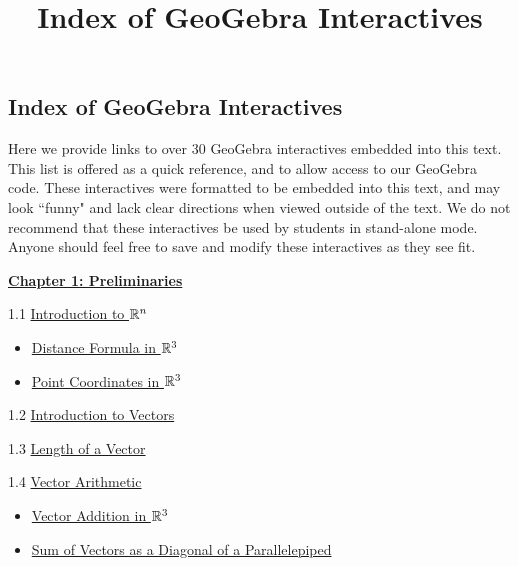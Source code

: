 \documentclass{ximera}
\title{Index of GeoGebra Interactives} \license{CC BY-NC-SA 4.0}
\begin{document}
\begin{abstract}
\end{abstract}
\maketitle

\begin{onlineOnly}
\section*{Index of GeoGebra Interactives}
\end{onlineOnly}

Here we provide links to over 30 GeoGebra interactives embedded into this text.  This list is offered as a quick reference, and to allow access to our GeoGebra code. These interactives were formatted to be embedded into this text, and may look ``funny" and lack clear directions when viewed outside of the text. We do not recommend that these interactives be used by students in stand-alone mode.  Anyone should feel free to save and modify these interactives as they see fit.


\href{https://ximera.osu.edu/linearalgebradzv3/LinearAlgebraInteractiveIntro/XLAChapter_prelim/main}{\textbf{Chapter 1: Preliminaries}}
	
1.1	\href{https://ximera.osu.edu/linearalgebradzv3/LinearAlgebraInteractiveIntro/RRN-0010/main}{Introduction to $\mathbb{R}^n$}
\begin{itemize}
\item
\href{https://www.geogebra.org/m/dc267r6v}{Distance Formula in $\mathbb{R}^3$}
\item
\href{https://www.geogebra.org/m/bynu3r84}{Point Coordinates in $\mathbb{R}^3$}
\end{itemize}
	
1.2	\href{https://ximera.osu.edu/linearalgebradzv3/LinearAlgebraInteractiveIntro/VEC-0010/main}{Introduction to Vectors}
	
1.3	\href{https://ximera.osu.edu/linearalgebradzv3/LinearAlgebraInteractiveIntro/VEC-0020/main}{Length of a Vector}
	
1.4	\href{https://ximera.osu.edu/linearalgebradzv3/LinearAlgebraInteractiveIntro/VEC-0030/main}{Vector Arithmetic}

\begin{itemize}
    \item 
    \href{https://www.geogebra.org/m/ccpev33m}{Vector Addition in $\mathbb{R}^3$}
    \item
    \href{https://www.geogebra.org/m/bpzfb7vr}{Sum of Vectors as a Diagonal of a Parallelepiped}
\end{itemize}
	
\end{document}
